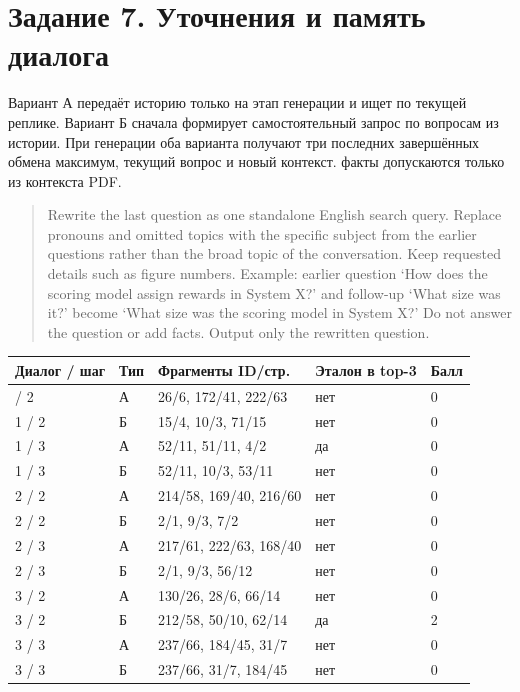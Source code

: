 \documentclass[12pt,a4paper]{article}
\begin{document}
\hypertarget{ux437ux430ux434ux430ux43dux438ux435-7.-ux443ux442ux43eux447ux43dux435ux43dux438ux44f-ux438-ux43fux430ux43cux44fux442ux44c-ux434ux438ux430ux43bux43eux433ux430}{%
\section{Задание 7. Уточнения и память
диалога}\label{ux437ux430ux434ux430ux43dux438ux435-7.-ux443ux442ux43eux447ux43dux435ux43dux438ux44f-ux438-ux43fux430ux43cux44fux442ux44c-ux434ux438ux430ux43bux43eux433ux430}}

Вариант А передаёт историю только на этап генерации и ищет по текущей
реплике. Вариант Б сначала формирует самостоятельный запрос по вопросам
из истории. При генерации оба варианта получают три последних
завершённых обмена максимум, текущий вопрос и новый контекст. факты
допускаются только из контекста PDF.

\begin{quote}
Rewrite the last question as one standalone English search query.
Replace pronouns and omitted topics with the specific subject from the
earlier questions rather than the broad topic of the conversation. Keep
requested details such as figure numbers. Example: earlier question `How
does the scoring model assign rewards in System X?' and follow-up `What
size was it?' become `What size was the scoring model in System X?' Do
not answer the question or add facts. Output only the rewritten
question.
\end{quote}

\begin{longtable}[]{@{}lllll@{}}
\toprule\noalign{}
Диалог / шаг & Тип & Фрагменты ID/стр. & Эталон в top-3 & Балл \\
\midrule\noalign{}
\endhead
\bottomrule\noalign{}
\endlastfoot
1 / 2 & А & 26/6, 172/41, 222/63 & нет & 0 \\
1 / 2 & Б & 15/4, 10/3, 71/15 & нет & 0 \\
1 / 3 & А & 52/11, 51/11, 4/2 & да & 0 \\
1 / 3 & Б & 52/11, 10/3, 53/11 & нет & 0 \\
2 / 2 & А & 214/58, 169/40, 216/60 & нет & 0 \\
2 / 2 & Б & 2/1, 9/3, 7/2 & нет & 0 \\
2 / 3 & А & 217/61, 222/63, 168/40 & нет & 0 \\
2 / 3 & Б & 2/1, 9/3, 56/12 & нет & 0 \\
3 / 2 & А & 130/26, 28/6, 66/14 & нет & 0 \\
3 / 2 & Б & 212/58, 50/10, 62/14 & да & 2 \\
3 / 3 & А & 237/66, 184/45, 31/7 & нет & 0 \\
3 / 3 & Б & 237/66, 31/7, 184/45 & нет & 0 \\
\end{longtable}
\end{document}
